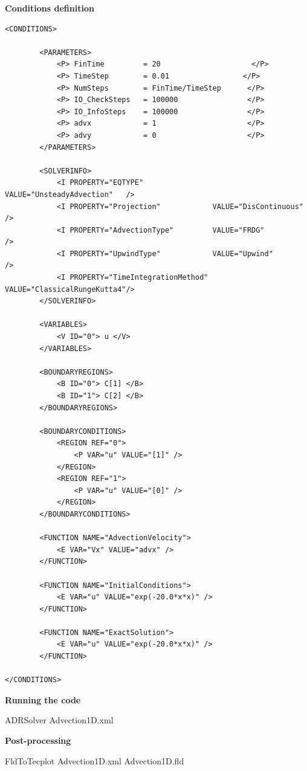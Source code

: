 \textbf{\footnotesize{Conditions definition}}

\begin{lstlisting}[style=XMLStyle]
<CONDITIONS>
    
        <PARAMETERS>
            <P> FinTime         = 20                     </P>
            <P> TimeStep        = 0.01                 </P>
            <P> NumSteps        = FinTime/TimeStep      </P>
            <P> IO_CheckSteps   = 100000                </P>
            <P> IO_InfoSteps    = 100000                </P>
            <P> advx            = 1                     </P>
            <P> advy            = 0                     </P>
        </PARAMETERS>
        
        <SOLVERINFO>
            <I PROPERTY="EQTYPE"                VALUE="UnsteadyAdvection"   />
            <I PROPERTY="Projection"            VALUE="DisContinuous"       />
            <I PROPERTY="AdvectionType"         VALUE="FRDG"                />
            <I PROPERTY="UpwindType"            VALUE="Upwind"              />
            <I PROPERTY="TimeIntegrationMethod" VALUE="ClassicalRungeKutta4"/>
        </SOLVERINFO>

        <VARIABLES>
            <V ID="0"> u </V>
        </VARIABLES>

        <BOUNDARYREGIONS>
            <B ID="0"> C[1] </B>
            <B ID="1"> C[2] </B>
        </BOUNDARYREGIONS>

        <BOUNDARYCONDITIONS>
            <REGION REF="0">
                <P VAR="u" VALUE="[1]" />
            </REGION>
            <REGION REF="1">
                <P VAR="u" VALUE="[0]" />
            </REGION>
        </BOUNDARYCONDITIONS>

        <FUNCTION NAME="AdvectionVelocity">
            <E VAR="Vx" VALUE="advx" />
        </FUNCTION>
        
        <FUNCTION NAME="InitialConditions">
            <E VAR="u" VALUE="exp(-20.0*x*x)" />
        </FUNCTION>

        <FUNCTION NAME="ExactSolution">
            <E VAR="u" VALUE="exp(-20.0*x*x)" />
        </FUNCTION>

</CONDITIONS>
\end{lstlisting}

\textbf{Running the code}

ADRSolver Advection1D.xml

\textbf{Post-processing}

FldToTecplot Advection1D.xml Advection1D.fld \\

